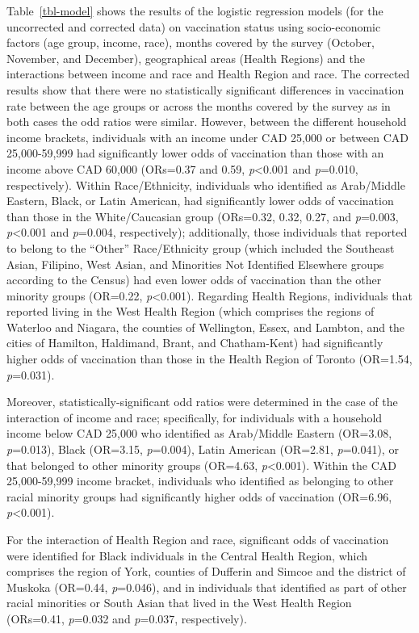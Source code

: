 \documentclass[
  letterpaper,
  DIV=11,
  numbers=noendperiod]{scrartcl}
\begin{document}
Table~\ref{tbl-model} shows the results of the logistic regression
models (for the uncorrected and corrected data) on vaccination status
using socio-economic factors (age group, income, race), months covered
by the survey (October, November, and December), geographical areas
(Health Regions) and the interactions between income and race and Health
Region and race. The corrected results show that there were no
statistically significant differences in vaccination rate between the
age groups or across the months covered by the survey as in both cases
the odd ratios were similar. However, between the different household
income brackets, individuals with an income under CAD 25,000 or between
CAD 25,000-59,999 had significantly lower odds of vaccination than those
with an income above CAD 60,000 (ORs=0.37 and 0.59,
\emph{p}\textless0.001 and \emph{p}=0.010, respectively). Within
Race/Ethnicity, individuals who identified as Arab/Middle Eastern,
Black, or Latin American, had significantly lower odds of vaccination
than those in the White/Caucasian group (ORs=0.32, 0.32, 0.27, and
\emph{p}=0.003, \emph{p}\textless0.001 and \emph{p}=0.004,
respectively); additionally, those individuals that reported to belong
to the ``Other'' Race/Ethnicity group (which included the Southeast
Asian, Filipino, West Asian, and Minorities Not Identified Elsewhere
groups according to the Census) had even lower odds of vaccination than
the other minority groups (OR=0.22, \emph{p}\textless0.001). Regarding
Health Regions, individuals that reported living in the West Health
Region (which comprises the regions of Waterloo and Niagara, the
counties of Wellington, Essex, and Lambton, and the cities of Hamilton,
Haldimand, Brant, and Chatham-Kent) had significantly higher odds of
vaccination than those in the Health Region of Toronto (OR=1.54,
\emph{p}=0.031).

Moreover, statistically-significant odd ratios were determined in the
case of the interaction of income and race; specifically, for
individuals with a household income below CAD 25,000 who identified as
Arab/Middle Eastern (OR=3.08, \emph{p}=0.013), Black (OR=3.15,
\emph{p}=0.004), Latin American (OR=2.81, \emph{p}=0.041), or that
belonged to other minority groups (OR=4.63, \emph{p}\textless0.001).
Within the CAD 25,000-59,999 income bracket, individuals who identified
as belonging to other racial minority groups had significantly higher
odds of vaccination (OR=6.96, \emph{p}\textless0.001).

For the interaction of Health Region and race, significant odds of
vaccination were identified for Black individuals in the Central Health
Region, which comprises the region of York, counties of Dufferin and
Simcoe and the district of Muskoka (OR=0.44, \emph{p}=0.046), and in
individuals that identified as part of other racial minorities or South
Asian that lived in the West Health Region (ORs=0.41, \emph{p}=0.032 and
\emph{p}=0.037, respectively).
\end{document}
